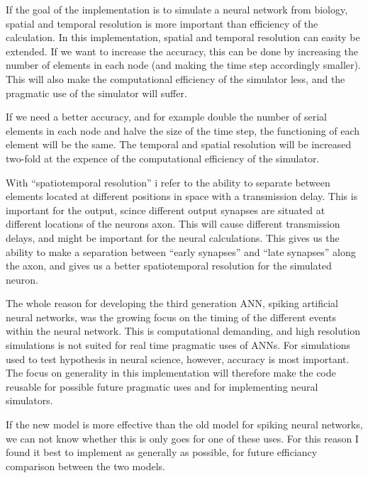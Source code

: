 \documentclass[b5paper,11 pt]{report}
\begin{document}
If the goal of the implementation is to simulate a neural network from biology, spatial and temporal resolution is more important than efficiency of the calculation.
In this implementation, spatial and temporal resolution can easity be extended.
If we want to increase the accuracy, this can be done by increasing the number of elements in each node (and making the time step accordingly smaller).
This will also make the computational efficiency of the simulator less, and the pragmatic use of the simulator will suffer.

If we need a better accuracy, and for example double the number of serial elements in each node and halve the size of the time step, the functioning of each element will be the same.
The temporal and spatial resolution will be increased two-fold at the expence of the computational efficiency of the simulator.

With ``spatiotemporal resolution'' i refer to the ability to separate between elements located at different positions in space with a transmission delay.
This is important for the output, scince different output synapses are situated at different locations of the neurons axon.
This will cause different transmission delays, and might be important for the neural calculations.
This gives us the ability to make a separation between ``early synapses'' and ``late synapses'' along the axon, and gives us a better spatiotemporal resolution for the simulated neuron.

The whole reason for developing the third generation ANN, spiking artificial neural networks, was the growing focus on the timing of the different events within the neural network.
This is computational demanding, and high resolution simulations is not suited for real time pragmatic uses of ANNs. For simulations used to test hypothesis in neural science, however, accuracy is most important.
The focus on generality in this implementation will therefore make the code reusable for possible future pragmatic uses and for implementing neural simulators.

If the new model is more effective than the old model for spiking neural networks, we can not know whether this is only goes for one of these uses. 
For this reason I found it best to implement as generally as possible, for future efficiancy comparison between the two models.
 
\end{document}
